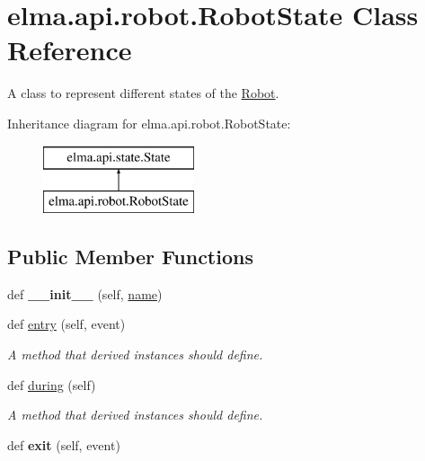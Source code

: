 \hypertarget{classelma_1_1api_1_1robot_1_1RobotState}{}\section{elma.\+api.\+robot.\+Robot\+State Class Reference}
\label{classelma_1_1api_1_1robot_1_1RobotState}


A class to represent different states of the \hyperlink{classelma_1_1api_1_1robot_1_1Robot}{Robot}.  


Inheritance diagram for elma.\+api.\+robot.\+Robot\+State\+:\begin{figure}[H]
\begin{center}
\leavevmode
\includegraphics[height=2.000000cm]{classelma_1_1api_1_1robot_1_1RobotState}
\end{center}
\end{figure}
\subsection*{Public Member Functions}
\begin{DoxyCompactItemize}
\item 
\mbox{\label{classelma_1_1api_1_1robot_1_1RobotState_a1499921c2c3d6b51569be5cfbcad1085}} 
def {\bfseries \+\_\+\+\_\+init\+\_\+\+\_\+} (self, \hyperlink{classelma_1_1api_1_1state_1_1State_af557d974acb64b3cd0b6bc687bb1658a}{name})
\item 
def \hyperlink{classelma_1_1api_1_1robot_1_1RobotState_a13a44c6ec8836f2235982916b615c977}{entry} (self, event)
\begin{DoxyCompactList}\small\item\em A method that derived instances should define. \end{DoxyCompactList}\item 
def \hyperlink{classelma_1_1api_1_1robot_1_1RobotState_afc16183bb851de813f3269937c2360a6}{during} (self)
\begin{DoxyCompactList}\small\item\em A method that derived instances should define. \end{DoxyCompactList}\item 
\mbox{\label{classelma_1_1api_1_1robot_1_1RobotState_aa9054b608060dd161e4a18f194f62689}} 
def {\bfseries exit} (self, event)
\end{DoxyCompactItemize}


